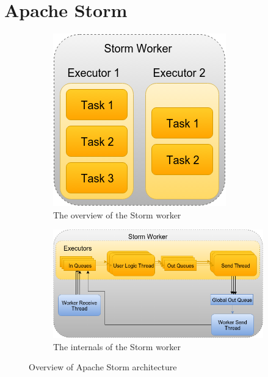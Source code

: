 \documentclass[conference]{IEEEtran}
\begin{document}
\lipsum[2-6]


\cite{InfoQGameChanger}



\section{Apache Storm}
\label{sec:ApacheStorm}


\begin{figure}[!h]
\centering
	\begin{subfigure}{.55\columnwidth}
		\includegraphics[scale=0.45]{figures/StormWorker}
		    \caption{The overview of the Storm worker}
		    \label{fig:StormWorkerOverview}
	\end{subfigure}\hspace{2.9em}
	\begin{subfigure}{1.35\columnwidth}
		\includegraphics[scale=0.45]{figures/StormWorkerDetail}
		    \caption{The internals of the Storm worker}
		    \label{fig:StormWorkerDetail}
	\end{subfigure}\hfill
\label{StormOverview}
\caption{Overview of Apache Storm architecture}
\end{figure}
\end{document}
